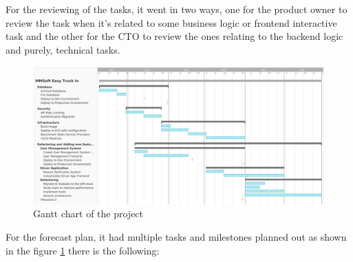 For the reviewing of the tasks, it went in two ways, one for the product owner to
review the task when it's related to some business logic or frontend interactive task
and the other for the CTO to review the ones relating to the backend logic and purely,
technical tasks.

\begin{figure}
    \centering
    \includegraphics[width=\textwidth]{images/Plan.jpeg}
    \caption{Gantt chart of the project}
    \label{fig:gantt_chart}
\end{figure}

For the forecast plan, it had multiple tasks and milestones planned out as shown in the
\newline figure \ref{fig:gantt_chart} there is the following:

